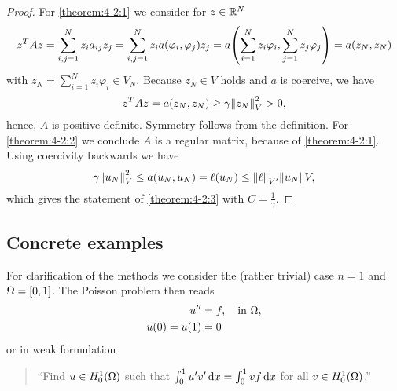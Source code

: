 \begin{proof}
    For \ref{theorem:4-2:1} we consider for \(z \in \R^N\)
    \[
        z^T Az = \sum_{i, j = 1}^N z_i a_{ij}z_j = \sum_{i, j = 1}^N z_i a\parentheses*{\varphi_i, \varphi_j}z_j = a\parentheses*{\sum_{i = 1}^N z_i \varphi_i, \sum_{j = 1}^N z_j \varphi_j} = a\parentheses*{z_N, z_N}
    \]
    with \(z_N = \sum_{i = 1}^N z_i \varphi_i \in V_N\).
    Because \(z_N \in V\) holds and \(a\) is coercive, we have
    \[
        z^T Az = a\parentheses*{z_N, z_N} \ge \gamma\norm*{z_N}_V^2 > 0,
    \]
    hence, \(A\) is positive definite.
    Symmetry follows from the definition.
    For \ref{theorem:4-2:2} we conclude \(A\) is a regular matrix, because of \ref{theorem:4-2:1}.
    Using coercivity backwards we have
    \[
        \gamma\norm*{u_N}_V^2 \le a\parentheses*{u_N, u_N} = \ell\parentheses*{u_N} \le \norm*{\ell}_{V'}\norm*{u_N}V,
    \]
    which gives the statement of \ref{theorem:4-2:3} with \(C = \frac{1}{\gamma}\).
\end{proof}

\subsection{Concrete examples}

For clarification of the methods we consider the (rather trivial) case \(n = 1\) and \(\Omega = \brackets*{0, 1}\).
The Poisson problem then reads
\begin{align*}
    u'' &= f, \quad \text{in }\Omega,\\
    u\parentheses*{0} = u\parentheses*{1} &= 0
\end{align*}
or in weak formulation
\begin{quote}
    ``Find \(u \in H_0^1\parentheses*{\Omega}\) such that \(\int_0^1 u'v'\d x = \int_0^1 vf\d x\) for all \(v \in H_0^1\parentheses*{\Omega}\).''
\end{quote}

